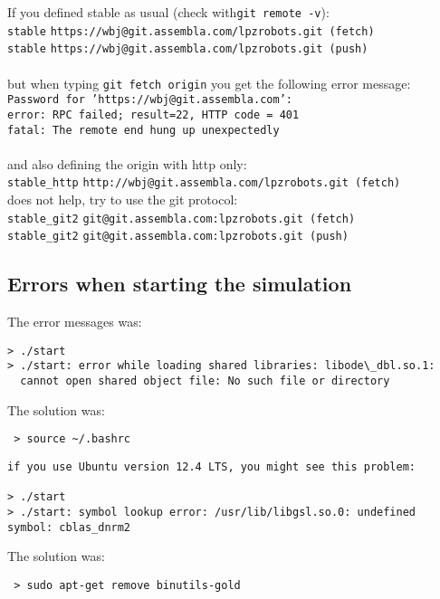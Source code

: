 If you defined stable as usual (check with{\tt git remote -v}):\\
 \nolinkurl{stable}    \nolinkurl{https://wbj@git.assembla.com/lpzrobots.git (fetch)}\\
 \nolinkurl{stable}    \nolinkurl{https://wbj@git.assembla.com/lpzrobots.git (push)}\\\\
%
but when typing {\tt git fetch origin} you get the following error message: \\
{\tt Password for 'https://wbj@git.assembla.com':} \\
{\tt error: RPC failed; result=22, HTTP code = 401} \\
{\tt fatal: The remote end hung up unexpectedly} \\\\
%
and also defining the origin with http only:\\
\nolinkurl{stable_http}    \nolinkurl{http://wbj@git.assembla.com/lpzrobots.git (fetch)}\\
does not help, try to use the git protocol:\\
\nolinkurl{stable_git2}    \nolinkurl{git@git.assembla.com:lpzrobots.git (fetch)}\\
\nolinkurl{stable_git2}      \nolinkurl{git@git.assembla.com:lpzrobots.git (push)}










\subsection{Errors when starting the simulation}

The error messages was:

\begin{lstlisting}
> ./start
> ./start: error while loading shared libraries: libode\_dbl.so.1:
  cannot open shared object file: No such file or directory
\end{lstlisting}
The solution was:
\begin{lstlisting}
 > source ~/.bashrc
\end{lstlisting}


\begin{lstlisting}
if you use Ubuntu version 12.4 LTS, you might see this problem:

> ./start
> ./start: symbol lookup error: /usr/lib/libgsl.so.0: undefined symbol: cblas_dnrm2
\end{lstlisting}
The solution was:
\begin{lstlisting}
 > sudo apt-get remove binutils-gold
\end{lstlisting}



